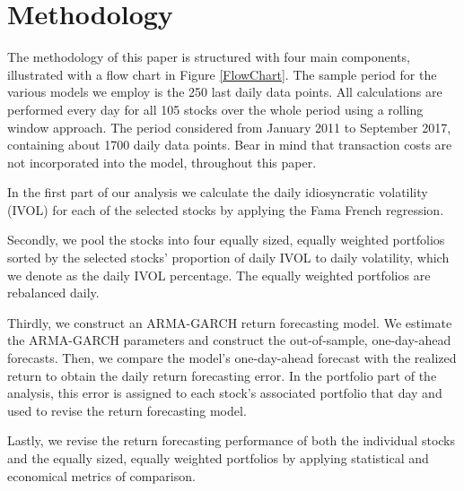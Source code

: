 \chapter{Methodology}
\label{Methodology}

The methodology of this paper is structured with four main components, illustrated with a flow chart in Figure \ref{FlowChart}. The sample period for the various models we employ is the 250 last daily data points. All calculations are performed every day for all 105 stocks over the whole period using a rolling window approach. The period considered from January 2011 to September 2017, containing about 1700 daily data points. Bear in mind that transaction costs are not incorporated into the model, throughout this paper.

In the first part of our analysis we calculate the daily idiosyncratic volatility (IVOL) for each of the selected stocks by applying the Fama French regression.

Secondly, we pool the stocks into four equally sized, equally weighted portfolios sorted by the selected stocks' proportion of daily IVOL to daily volatility, which we denote as the daily IVOL percentage. The equally weighted portfolios are rebalanced daily.

Thirdly, we construct an ARMA-GARCH return forecasting model. We estimate the ARMA-GARCH parameters and construct the out-of-sample, one-day-ahead forecasts. Then, we compare the model’s one-day-ahead forecast with the realized return to obtain the daily return forecasting error. In the portfolio part of the analysis, this error is assigned to each stock's associated portfolio that day and used to revise the return forecasting model. 

Lastly, we revise the return forecasting performance of both the individual stocks and the equally sized, equally weighted portfolios by applying statistical and economical metrics of comparison.

